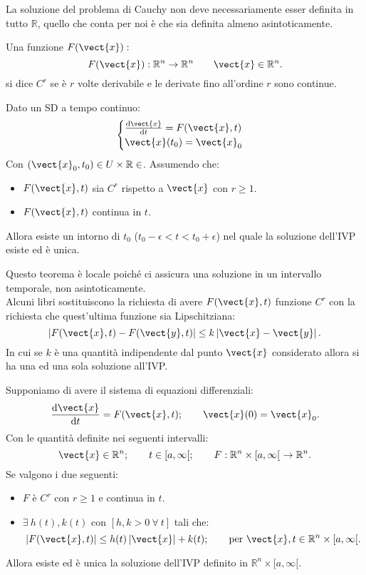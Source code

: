 \noindent
La soluzione del problema di Cauchy non deve necessariamente esser definita in tutto $\mathbb{R}$, quello che conta per noi è che sia definita almeno asintoticamente.
\begin{defn}[Funzione $C^r$]
    Una funzione $F(\vect{x}):$
    \[
	F(\vect{x}): \mathbb{R}^n\to \mathbb{R}^n \qquad \vect{x}\in \mathbb{R}^n
    .\] si dice $C^r$ se è $r$ volte derivabile e le derivate fino all'ordine $r$ sono continue.
\end{defn}
\noindent
\begin{thm}
   Dato un SD a tempo continuo:
   \[
       \begin{cases}
	   \frac{\text{d} \vect{x}}{\text{d} t} = F(\vect{x}, t)\\
	   \vect{x} (t_0) = \vect{x}_0
       \end{cases}
   \] 
   Con $\left(\vect{x}_0, t_0\right) \in U\times \mathbb{R} \in $. Assumendo che:
   \begin{itemize}
       \item $F(\vect{x},t)$ sia $C^r$ rispetto a $\vect{x}$ con $r\ge 1$.
       \item $F(\vect{x}, t)$ continua in $t$.
   \end{itemize}
   Allora esiste un intorno di $t_0$ ($t_0-\epsilon  < t < t_0+\epsilon$) nel quale la soluzione dell'IVP esiste ed è unica.
\end{thm}
\noindent
Questo teorema è locale poiché ci assicura una soluzione in un intervallo temporale, non asintoticamente.\\
Alcuni libri sostituiscono la richiesta di avere $F(\vect{x}, t)$ funzione $C^r$ con la richiesta che quest'ultima funzione sia Lipschitziana:
\[
    \left|F(\vect{x}, t)-F(\vect{y}, t)\right| \le k \left|\vect{x}-\vect{y}\right|
.\] 
In cui se $k$  è una quantità indipendente dal punto $\vect{x}$  considerato allora si ha una ed una sola soluzione all'IVP.
\begin{thm}
    Supponiamo di avere il sistema di equazioni differenziali:
    \[
	\frac{\text{d} \vect{x}}{\text{d} t} = F(\vect{x},t); \qquad \vect{x}(0) = \vect{x}_0
    .\] 
    Con le quantità definite nei seguenti intervalli:
    \[
        \vect{x}\in \mathbb{R}^n; \qquad t \in [a,\infty[; \qquad F: \mathbb{R}^n\times [a,\infty[ \ \to \mathbb{R}^n
    .\] 
    Se valgono i due seguenti:
    \begin{itemize}
        \item $F$ è $C^r$ con $r\ge 1$ e continua in $t$.
	\item $\exists \ h(t), k(t)$ con $\left[h, k > 0 \ \forall \ t\right]$ tali che:
	    \[
		\left|F(\vect{x}, t)\right|\le h(t)\left|\vect{x}\right|+k(t); \qquad \text{per } \vect{x}, t \in \mathbb{R}^n\times [a, \infty[
	    .\] 
    \end{itemize}
    Allora esiste ed è unica la soluzione dell'IVP definito in $\mathbb{R}^n\times [a,\infty[$.
\end{thm}
